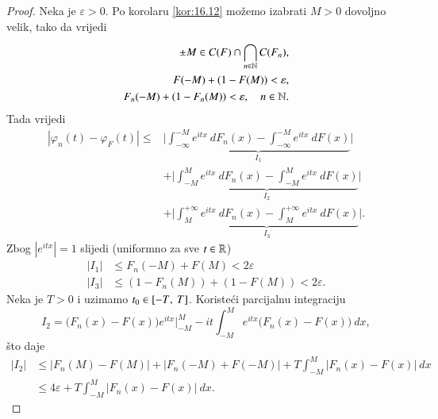 \begin{proof}
    Neka je $\varepsilon > 0$.
    Po korolaru \ref{kor:16.12} mo\v zemo izabrati $M > 0$ dovoljno velik, tako da vrijedi
    \begin{equation*}
        \begin{aligned}
            \pm M \in C(F) \cap \bigcap\limits_{n \in \mathbb{N}}^{} C(F_n),\\
            F(-M) + (1 - F(M)) < \varepsilon,\\
            F_n (-M) + (1 - F_n (M)) < \varepsilon, \quad n \in \mathbb{N}.
        \end{aligned}
    \end{equation*}
    Tada vrijedi
    \begin{equation*}
        \begin{aligned}
            | \varphi_n (t) - \varphi_F (t) | \leq& \Big| \underbrace{\int^{-M}_{-\infty} e^{itx} \: d F_n (x) - \int_{-\infty}^{-M} e^{itx} \: d F (x) }_{I_1} \Big|\\
            &+ \Big| \underbrace{\int_{-M}^{M} e^{itx} \: d F_n (x) - \int_{-M}^{M} e^{itx} \: d F (x) }_{I_2} \Big|\\
            &+ \Big| \underbrace{\int_{M}^{+\infty} e^{itx} \: d F_n (x) - \int_{M}^{+\infty} e^{itx} \: d F (x) }_{I_3} \Big|.
        \end{aligned}
    \end{equation*}
    Zbog $|e^{itx}| = 1$ slijedi (uniformno za sve $t \in \mathbb{R}$)
    \begin{equation*}
        \begin{aligned}
            |I_1| &\leq F_n (-M) + F(M) < 2 \varepsilon\\
            |I_3| &\leq (1 - F_n(M)) + (1 - F (M)) < 2 \varepsilon.
        \end{aligned}
    \end{equation*}
    Neka je $T > 0$ i uzimamo $t_0 \in [{-T}, \:{T}]$.
    Koriste\' ci parcijalnu integraciju
    \begin{equation*}
        I_2 = \big( F_n(x) - F(x) \big) e^{itx} \Big|_{-M}^{M} - it \int_{-M}^M e^{itx} \big( F_n (x) - F(x) \big) \: dx,
    \end{equation*}
    \v sto daje
    \begin{equation*}
        \begin{aligned}
            |I_2| &\leq |F_n(M) - F(M)| + |F_n(-M) + F(-M)| + T \int_{-M}^{M} |F_n (x) - F (x)| \: dx\\
            &\leq 4 \varepsilon + T \int_{-M}^{M} |F_n (x) - F (x)| \: dx.

\end{aligned}
\end{equation*}
\end{proof}
